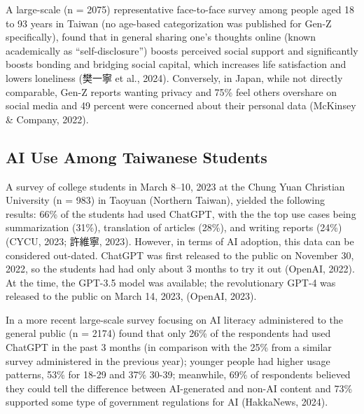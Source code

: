 \documentclass[
  12pt,
  letterpaper,
  DIV=11,
  numbers=noendperiod]{scrartcl}
\begin{document}
A large-scale (n = 2075) representative face-to-face survey among people
aged 18 to 93 years in Taiwan (no age-based categorization was published
for Gen-Z specifically), found that in general sharing one's thoughts
online (known academically as ``self-disclosure'') boosts perceived
social support and significantly boosts bonding and bridging social
capital, which increases life satisfaction and lowers loneliness (樊一寧
et al., 2024). Conversely, in Japan, while not directly comparable,
Gen-Z reports wanting privacy and 75\% feel others overshare on social
media and 49 percent were concerned about their personal data (McKinsey
\& Company, 2022).

\subsection{AI Use Among Taiwanese
Students}\label{ai-use-among-taiwanese-students}

A survey of college students in March 8--10, 2023 at the Chung Yuan
Christian University (n = 983) in Taoyuan (Northern Taiwan), yielded the
following results: 66\% of the students had used ChatGPT, with the the
top use cases being summarization (31\%), translation of articles
(28\%), and writing reports (24\%) (CYCU, 2023; 許維寧, 2023). However,
in terms of AI adoption, this data can be considered out-dated. ChatGPT
was first released to the public on November 30, 2022, so the students
had had only about 3 months to try it out (OpenAI, 2022). At the time,
the GPT-3.5 model was available; the revolutionary GPT‑4 was released to
the public on March 14, 2023, (OpenAI, 2023).

In a more recent large-scale survey focusing on AI literacy administered
to the general public (n = 2174) found that only 26\% of the respondents
had used ChatGPT in the past 3 months (in comparison with the 25\% from
a similar survey administered in the previous year); younger people had
higher usage patterns, 53\% for 18-29 and 37\% 30-39; meanwhile, 69\% of
respondents believed they could tell the difference between AI-generated
and non-AI content and 73\% supported some type of government
regulations for AI (HakkaNews, 2024).
\end{document}
